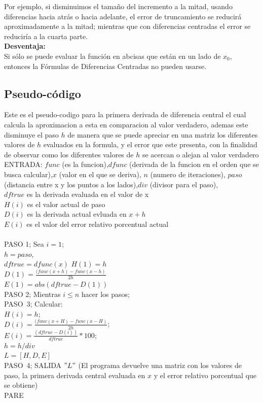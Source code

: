 \documentclass[journal,transmag]{IEEEtran}
\theoremstyle{mytheoremstyle}
\theoremstyle{mytheoremstyle}
\theoremstyle{myproblemstyle}
\begin{document}
 Por ejemplo, si disminuimos el tamaño del incremento a la mitad, usando diferencias hacia atrás o hacia adelante, el error de truncamiento se reducirá aproximadamente a la mitad; mientras que con diferencias centradas el error se reduciría a la cuarta parte.
\\

\textbf{Desventaja:}\\
Si sólo se puede evaluar la función en abcisas que están en un lado de $x_0$, entonces la Fórmulas de Diferencias Centradas no pueden usarse.
\subsection{Pseudo-código}
Este es el pseudo-codigo para la primera derivada de diferencia central el cual calcula la aproximacion a esta en comparacion al valor verdadero, ademas este disminuye el paso $h$ de manera que se puede apreciar en una matriz los diferentes valores de $h$ evaluados en la formula, y el error que este presenta, con la finalidad de observar como los diferentes valores de $h$ se acercan o alejan al valor verdadero \\

ENTRADA: $func$ (es la funcion),$dfunc$ (derivada de la funcion en el orden que se busca calcular),$x$ (valor en el que se deriva), $n$ (numero de iteraciones), $paso$(distancia entre x y los puntos a los lados),$div$ (divisor para el paso),\\

$dftrue$ es la derivada evaluada en el valor de x\\
$H(i)$ es el valor actual de paso\\
$D(i)$ es la derivada actual evluada en $x+h$\\
$E(i)$ es el valor del error relativo porcentual actual\\
\\
PASO 1; Sea $i=1$;\\
$h=paso$,\\ 
$dftrue=dfunc(x)$
$H(1)=h$\\
$D(1)=\frac{(func(x+h)-func(x-h)}{2h}$\\
$E(1)=abs(dftrue-D(1))$\\
PASO 2; Mientras $i \leq n$ hacer los pasos;\\
PASO\ 3; Calcular:\\
$H(i)=h$;\\
$D(i)=\frac{(func(x+H)-func(x-H)}{2h}$;\\
$E(i)=\frac{(dftrue-D(i))}{dftrue}*100$;\\
$h=h/div$\\
$L=[H,D,E]$\\
PASO\ 4; SALIDA $"L"$ (El programa devuelve una matriz con los valores de paso, la primera derivada central evaluada en $x$ y el error relativo porcentual que se obtiene)\\
PARE
\end{document}
